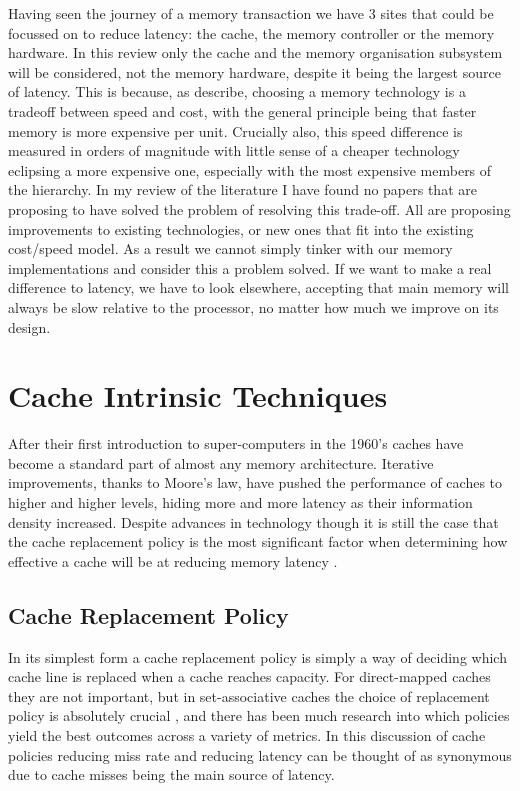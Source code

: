 Having seen the journey of a memory transaction we have 3 sites that could be focussed on to reduce latency: the cache, the memory controller or the memory hardware. In this review only the cache and the memory organisation subsystem will be considered, not the memory hardware, despite it being the largest source of latency. This is because, as \citet{pattersonComputerOrganizationDesign2018} describe, choosing a memory technology is a tradeoff between speed and cost, with the general principle being that faster memory is more expensive per unit. Crucially also, this speed difference is measured in orders of magnitude with little sense of a cheaper technology eclipsing a more expensive one, especially with the most expensive members of the hierarchy. In my review of the literature I have found no papers that are proposing to have solved the problem of resolving this trade-off. All are proposing improvements to existing technologies, or new ones that fit into the existing cost/speed model. As a result we cannot simply tinker with our memory implementations and consider this a problem solved. If we want to make a real difference to latency, we have to look elsewhere, accepting that main memory will always be slow relative to the processor, no matter how much we improve on its design.

\section{Cache Intrinsic Techniques}

\label{sec:cache}

After their first introduction to super-computers in the 1960's \cite{pattersonComputerOrganizationDesign2018} caches have become a standard part of almost any memory architecture. Iterative improvements, thanks to Moore's law, have pushed the performance of caches to higher and higher levels, hiding more and more latency as their information density increased. Despite advances in technology though it is still the case that the cache replacement policy is the most significant factor when determining how effective a cache will be at reducing memory latency \cite{hennessyComputerArchitectureQuantitative2019}.

\subsection{Cache Replacement Policy}
\label{sec:replacement_policy}

In its simplest form a cache replacement policy is simply a way of deciding which cache line is replaced when a cache reaches capacity. For direct-mapped caches they are not important, but in set-associative caches the choice of replacement policy is absolutely crucial \cite{hennessyComputerArchitectureQuantitative2019}, and there has been much research into which policies yield the best outcomes across a variety of metrics. In this discussion of cache policies reducing miss rate and reducing latency can be thought of as synonymous due to cache misses being the main source of latency.

